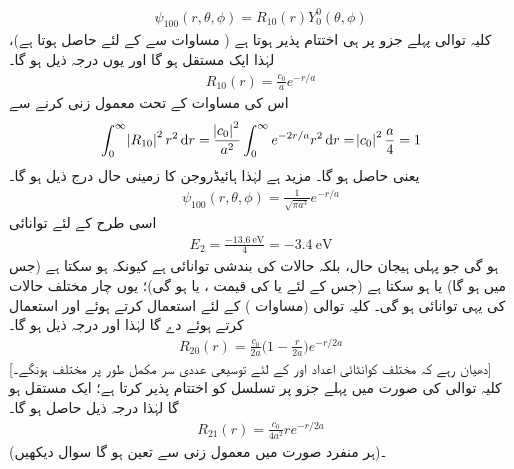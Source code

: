  \begin{align}
\psi_{100}(r,\theta,\phi)=R_{10}(r)Y_{0}^{0}(\theta,\phi) 
\end{align}
 کلیہ توالی پہلے جزو پر ہی اختتام پذیر ہوتا ہے  ( مساوات  سے  کے لئے       حاصل ہوتا ہے)،  لہٰذا   ایک مستقل      ہو گا اور  یوں درجہ ذیل ہو گا۔
   \begin{align}
R_{10}(r)=\frac{c_{0}}{a}e^{-r/a} 
\end{align}
   اس کی مساوات  کے تحت معمول زنی کرنے   سے
\begin{align*}
\int_{0}^{\infty}\abs{R_{10}}^{2}r^{2}\dif{r}=\frac{\abs{c_0}^{2}}{a^{2}}\int_{0}^{\infty}e^{-2r/a}r^{2}\dif{r}=\abs{c_{0}}^{2}\frac{a}{4}=1 
\end{align*}
یعنی  حاصل ہو گا۔ مزید  ہے لہٰذا  ہائیڈروجن کا زمینی حال درج ذیل ہو گا۔
\begin{align}\label{مساوات_تین_ابعاد_زمینی_ہائیڈروجن}
\psi_{100}(r,\theta,\phi)=\frac{1}{\sqrt{\pi a^{3}}}e^{-r/a} 
\end{align}
اسی طرح  کے لئے توانائی
\begin{align}
E_{2}=\frac{\SI{-13.6}{\electronvolt}}{4}=\SI{-3.4}{\electronvolt}
\end{align}
ہو گی جو پہلی ہیجان حال،  بلکہ  حالات کی بندشی توانائی ہے کیونکہ    ہو سکتا ہے (جس میں  ہو گا) یا  ہو سکتا ہے (جس  کے لئے یا   کی قیمت ،  یا  ہو گی)؛ یوں چار مختلف حالات کی یہی توانائی ہو گی۔
 کلیہ توالی (مساوات )   کے لئے  استعمال کرتے ہوئے  اور  استعمال کرتے ہوئے  دے گا لہٰذا  اور درجہ ذیل ہو گا۔
 \begin{align}\label{مساوات_تین_ابعادی_رداسی_بیس}
R_{20}(r)=\frac{c_{0}}{2a}\big(1-\frac{r}{2a}\big)e^{-r/2a} 
\end{align}
[دھیان رہے کہ مختلف کوانٹائی اعداد  اور  کے لئے  توسیعی  عددی سر    مکمل طور پر مختلف ہونگے۔] کلیہ توالی 
     کی صورت میں پہلے جزو پر تسلسل کو اختتام پذیر کرتا ہے؛   ایک مستقل ہو گا  لہٰذا درجہ ذیل حاصل ہو گا۔
   \begin{align}\label{مساوات_تین_ابعادی_رداسی_اکیس}
R_{21}(r)=\frac{c_{0}}{4a^{2}}re^{-r/2a} 
\end{align}
(ہر منفرد صورت میں  معمول زنی سے تعین ہو گا سوال    دیکھیں)۔

